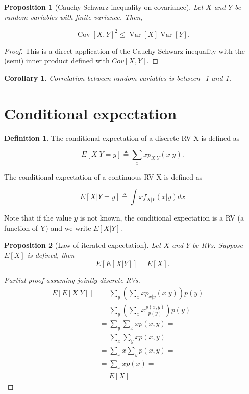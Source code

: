 \documentclass{book}
\theoremstyle{plain}%
\newtheorem{corollary}{Corollary}[section]
\newtheorem{proposition}{Proposition}[section]
\theoremstyle{definition}
\newtheorem{definition}{Definition}[section]
\DeclareMathOperator{\Var}{Var}
\DeclareMathOperator{\Cov}{Cov}
\begin{document}
\begin{proposition}[Cauchy-Schwarz inequality on covariance]
Let $X$ and $Y$ be random variables with finite variance. Then,

$$\Cov[X,Y]^2 \leq \Var[X]\Var[Y].$$
\end{proposition}

\begin{proof}
This is a direct application of the Cauchy-Schwarz inequality with the (semi) inner product defined with $Cov[X,Y]$.
\end{proof}

\begin{corollary}
Correlation between random variables is between -1 and 1.
\end{corollary}

\section{Conditional expectation}

\begin{definition}
The conditional expectation of a discrete RV X is defined as

$$E[X|Y = y] \triangleq \sum_x x p_{X|Y}(x|y).$$

The conditional expectation of a continuous RV X is defined as

$$E[X|Y = y] \triangleq \int x f_{X|Y}(x|y)dx$$
\end{definition}

Note that if the value $y$ is not known, the conditional expectation is a RV (a function of Y) and we write $E[X|Y]$.

\begin{proposition}[Law of iterated expectation] Let $X$ and $Y$ be RVs. Suppose $E[X]$ is defined, then
$$E[E[X|Y]] = E[X].$$
\end{proposition}

\begin{proof}[Partial proof assuming jointly discrete RVs] \begin{align*}
E[E[X|Y]] &= \sum_y \left(\sum_x x p_{x|y}(x|y)\right) p(y) =\\
 &= \sum_y \left(\sum_x x \frac{p(x,y)}{p(y)}\right) p(y) =\\
 &= \sum_y \sum_x x p(x,y) =\\
 &= \sum_x \sum_y x p(x,y) =\\
  &= \sum_x x \sum_y p(x,y) =\\
  &= \sum_x x p(x) =\\
  &= E[X]
\end{align*}
\end{proof}
\end{document}
